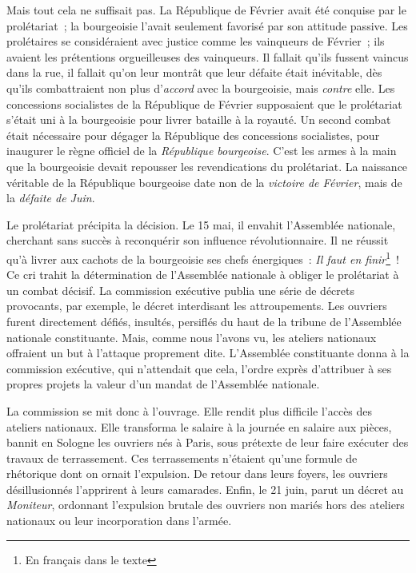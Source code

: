 \documentclass[french,twoside]{book} %
\begin{document}
Mais tout cela ne suffisait pas. La République de Février avait été conquise par le prolétariat ; la bourgeoisie l’avait seulement favorisé par son attitude passive. Les prolétaires se considéraient avec justice comme les vainqueurs de Février ; ils avaient les prétentions orgueilleuses des vainqueurs. Il fallait qu’ils fussent vaincus dans la rue, il fallait qu’on leur montrât que leur défaite était inévitable, dès qu’ils combattraient non plus d’\emph{accord} avec la bourgeoisie, mais \emph{contre} elle. Les concessions socialistes de la République de Février supposaient que le prolétariat s’était uni à la bourgeoisie pour livrer bataille à la royauté. Un second combat était nécessaire pour dégager la République des concessions socialistes, pour inaugurer le règne officiel de la \emph{République bourgeoise}. C’est les armes à la main que la bourgeoisie devait repousser les revendications du prolétariat. La naissance véritable de la République bourgeoise date non de la \emph{victoire de Février}, mais de la \emph{défaite de Juin}.\par
Le prolétariat précipita la décision. Le 15 mai, il envahit l’Assemblée nationale, cherchant sans succès à reconquérir son influence révolutionnaire. Il ne réussit qu’à livrer aux cachots de la bourgeoisie ses chefs énergiques : \emph{Il faut en finir}\footnote{En français dans le texte} ! Ce cri trahit la détermination de l’Assemblée nationale à obliger le prolétariat à un combat décisif. La commission exécutive publia une série de décrets provocants, par exemple, le décret interdisant les attroupements. Les ouvriers furent directement défiés, insultés, persiflés du haut de la tribune de l’Assemblée nationale constituante. Mais, comme nous l’avons vu, les ateliers nationaux offraient un but à l’attaque proprement dite. L’Assemblée constituante donna à la commission exécutive, qui n’attendait que cela, l’ordre exprès d’attribuer à ses propres projets la valeur d’un mandat de l’Assemblée nationale.\par
La commission se mit donc à l’ouvrage. Elle rendit plus difficile l’accès des ateliers nationaux. Elle transforma le salaire à la journée en salaire aux pièces, bannit en Sologne les ouvriers nés à Paris, sous prétexte de leur faire exécuter des travaux de terrassement. Ces terrassements n’étaient qu’une formule de rhétorique dont on ornait l’expulsion. De retour dans leurs foyers, les ouvriers désillusionnés l’apprirent à leurs camarades. Enfin, le 21 juin, parut un décret au \emph{Moniteur}, ordonnant l’expulsion brutale des ouvriers non mariés hors des ateliers nationaux ou leur incorporation dans l’armée.\par
\end{document}

